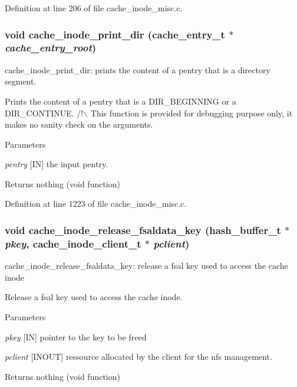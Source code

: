 Definition at line 206 of file cache\_\-inode\_\-misc.c.
\subsubsection[{cache\_\-inode\_\-print\_\-dir}]{\setlength{\rightskip}{0pt plus 5cm}void cache\_\-inode\_\-print\_\-dir (cache\_\-entry\_\-t $\ast$ {\em cache\_\-entry\_\-root})}\label{cache__inode__misc_8c_ab405ebfdd83c07441a5f617862fd789a}
cache\_\-inode\_\-print\_\-dir: prints the content of a pentry that is a directory segment.

Prints the content of a pentry that is a DIR\_\-BEGINNING or a DIR\_\-CONTINUE. /!$\backslash$ This function is provided for debugging purpose only, it makes no sanity check on the arguments.


\begin{DoxyParams}{Parameters}
\item[{\em pentry}][IN] the input pentry.\end{DoxyParams}
\begin{DoxyReturn}{Returns}
nothing (void function) 
\end{DoxyReturn}


Definition at line 1223 of file cache\_\-inode\_\-misc.c.
\subsubsection[{cache\_\-inode\_\-release\_\-fsaldata\_\-key}]{\setlength{\rightskip}{0pt plus 5cm}void cache\_\-inode\_\-release\_\-fsaldata\_\-key (hash\_\-buffer\_\-t $\ast$ {\em pkey}, \/  cache\_\-inode\_\-client\_\-t $\ast$ {\em pclient})}\label{cache__inode__misc_8c_a85615042ce506cf412216455b73ada68}
cache\_\-inode\_\-release\_\-fsaldata\_\-key: release a fsal key used to access the cache inode

Release a fsal key used to access the cache inode.


\begin{DoxyParams}{Parameters}
\item[{\em pkey}][IN] pointer to the key to be freed \item[{\em pclient}][INOUT] ressource allocated by the client for the nfs management.\end{DoxyParams}
\begin{DoxyReturn}{Returns}
nothing (void function) 
\end{DoxyReturn}


